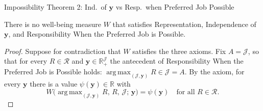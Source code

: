\documentclass[10pt]{beamer}
\DeclareMathOperator*{\argmax}{arg\,max}
\begin{document}
\begin{frame}[allowframebreaks]{Impossibility Theorem 2: Ind.\ of $\mathbf y$ vs Resp.\ when Preferred Job Possible}
\hypertarget{imp:thm2}{}%
\hyperlink{tab:classification}{}

\scriptsize
\begin{theorem}
There is no well-being measure $W$ that satisfies Representation, Independence
of $\mathbf y$, and Responsibility When the Preferred Job is Possible.
\end{theorem}
\framebreak
\begin{proof}
Suppose for contradiction that $W$ satisfies the three axioms. Fix
$A=\mathcal J$, so that for every $R\in\mathcal R$ and $\mathbf
y\in\mathbb R_+^{\mathcal J}$ the antecedent of Responsibility When the
Preferred Job is Possible holds: $\argmax_{(\mathcal
J,\mathbf y)}R\in\mathcal J=A$. By the axiom, for every $\mathbf y$ there is a
value $\psi(\mathbf y)\in\mathbb R$ with
\begin{equation*}
W\!\big(\argmax_{(\mathcal J,\mathbf y)}R,\,R,\,\mathcal J;\,\mathbf y\big)
=\psi(\mathbf y)\quad\text{for all }R\in\mathcal R.\end{equation*}


\end{proof}
\end{frame}
\end{document}
